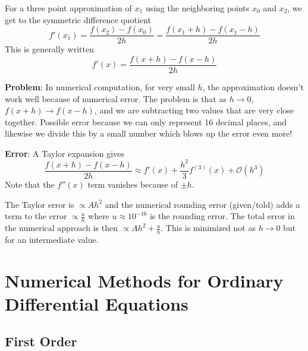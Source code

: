 \documentclass[11pt, a4paper]{article}
\begin{document}
For a three point approximation of $ x_1 $ using the neighboring points $ x_0 $ and $ x_2 $, we get to the symmetric difference quotient
\begin{equation*}
	f'(x_1) = \frac{f(x_2) - f(x_0)}{2h} = \frac{f(x_1 + h) - f(x_1 - h)}{2h}
\end{equation*}
This is generally written 
\begin{equation*}
	f'(x) = \frac{f(x + h) - f(x-h)}{2h}
\end{equation*}

\textbf{Problem}: In numerical computation, for very small $ h $, the approximation doesn't work well because of numerical error. The problem is that as $ h \to 0 $, $ f(x + h) \to f(x-h) $, and we are subtracting two values that are very close together. Possible error because we can only represent 16 decimal places, and likewise we divide this by a small number which blows up the error even more!

\textbf{Error}: A Taylor expansion gives
\begin{equation*}
	\frac{f(x + h) - f(x-h)}{2h} \approx f'(x) + \frac{h^2}{3}f^{(3)}(x) + \mathcal{O}(h^3)
\end{equation*}
Note that the $ f''(x) $ term vanishes because of $ \pm h $.

The Taylor error is $ \propto A h^2 $ and the numerical rounding error (given/told) adds a term to the error $ \propto \frac{u}{h} $ where $ u \approx 10^{-16} $ is the rounding error. The total error in the numerical approach is then $ \propto Ah^2 + \frac{u}{h} $. This is minimized not as $ h \to 0 $ but for an intermediate value.


\section{Numerical Methods for Ordinary Differential Equations}
\subsection{First Order}
\end{document}
